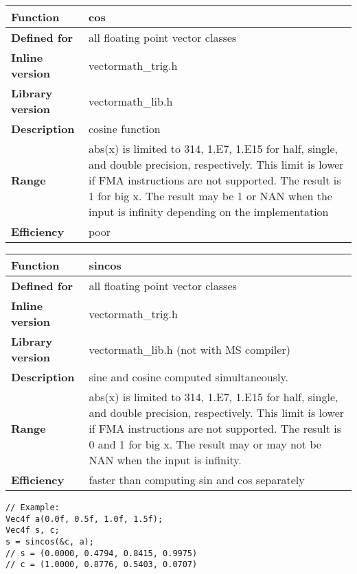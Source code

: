\documentclass[vcl_manual.tex]{subfiles}
\begin{document}
\begin{tabular}{|p{30mm}|p{120mm}|}
\hline
\bfseries Function & cos \\ \hline
\bfseries Defined for & all floating point vector classes \\ \hline
\bfseries Inline version & vectormath\_trig.h \\ \hline
\bfseries Library version & vectormath\_lib.h \\ \hline
\bfseries Description & cosine function \\ \hline
\bfseries Range & abs(x) is limited to 314, 1.E7, 1.E15 for half, single, and double precision, respectively. This limit is lower if FMA instructions are not supported. The result is 1 for big x. The result may be 1 or NAN when the input is infinity depending on the implementation \\ \hline
\bfseries Efficiency & poor \\ \hline
\end{tabular}


\begin{tabular}{|p{30mm}|p{120mm}|}
\hline
\bfseries Function & sincos \\ \hline
\bfseries Defined for & all floating point vector classes \\ \hline
\bfseries Inline version & vectormath\_trig.h \\ \hline
\bfseries Library version & vectormath\_lib.h (not with MS compiler) \\ \hline
\bfseries Description & sine and cosine computed simultaneously.\\ \hline
\bfseries Range & abs(x) is limited to 314, 1.E7, 1.E15 for half, single, and double precision, respectively. This limit is lower if FMA instructions are not supported. The result is 0 and 1 for big x. The result may or may not be NAN when the input is infinity. \\ \hline
\bfseries Efficiency & faster than computing sin and cos separately \\ \hline
\end{tabular}
\begin{lstlisting}[frame=none]
// Example:
Vec4f a(0.0f, 0.5f, 1.0f, 1.5f);
Vec4f s, c;
s = sincos(&c, a);
// s = (0.0000, 0.4794, 0.8415, 0.9975)
// c = (1.0000, 0.8776, 0.5403, 0.0707)
\end{lstlisting}
\end{document}
